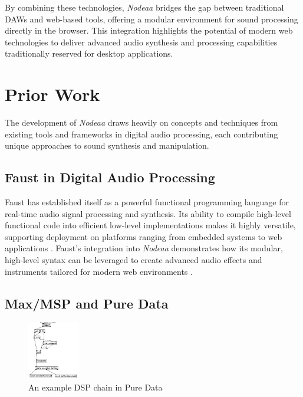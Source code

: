 \documentclass[10pt,twocolumn]{article}
\begin{document}
By combining these technologies, \textit{Nodeaa} bridges the gap between traditional DAWs and web-based tools, offering a modular environment for sound processing directly in the browser. This integration highlights the potential of modern web technologies to deliver advanced audio synthesis and processing capabilities traditionally reserved for desktop applications.

\section{Prior Work}

The development of \textit{Nodeaa} draws heavily on concepts and techniques from existing tools and frameworks in digital audio processing, each contributing unique approaches to sound synthesis and manipulation.

\subsection{Faust in Digital Audio Processing}

Faust has established itself as a powerful functional programming language for real-time audio signal processing and synthesis. Its ability to compile high-level functional code into efficient low-level implementations makes it highly versatile, supporting deployment on platforms ranging from embedded systems to web applications \cite{orlarey2009faust}. Faust’s integration into \textit{Nodeaa} demonstrates how its modular, high-level syntax can be leveraged to create advanced audio effects and instruments tailored for modern web environments \cite{letz2017compiling, letz2015faust}.


\subsection{Max/MSP and Pure Data}

\begin{figure}[ht]
    \centering
    \includegraphics[width=0.2\textwidth]{images/puredata.png}
    \caption{An example DSP chain in Pure Data}
    \label{fig:puredata}
\end{figure}
\end{document}
